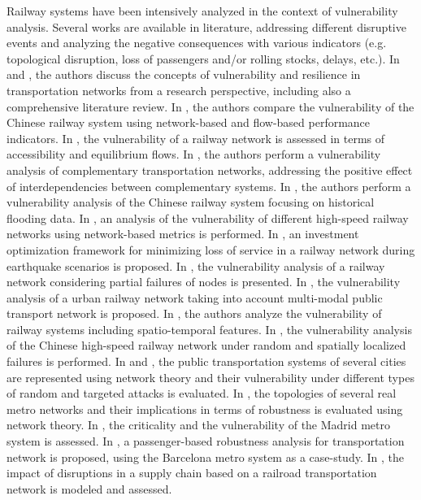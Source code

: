 \documentclass[review]{elsarticle}
\begin{document}
	Railway systems have been intensively analyzed in the context of vulnerability analysis. Several works are available in literature, addressing different disruptive events and analyzing the negative consequences with various indicators (e.g. topological disruption, loss of passengers and/or rolling stocks, delays, etc.). In \cite{mattsson2015vulnerability} and \cite{reggiani2015transport}, the authors discuss the concepts of vulnerability and resilience in transportation networks from a research perspective, including also a comprehensive literature review. In \cite{ouyang2014comparisons}, the authors compare the vulnerability of the Chinese railway system using network-based and flow-based performance indicators. In \cite{chen2007network}, the vulnerability of a railway network is assessed in terms of accessibility and equilibrium flows. In \cite{ouyang2015vulnerability}, the authors perform a vulnerability analysis of complementary transportation networks, addressing the positive effect of interdependencies between complementary systems. In \cite{hong2015vulnerability}, the authors perform a vulnerability analysis of the Chinese railway system focusing on historical flooding data. In \cite{zhang2016structural}, an analysis of the vulnerability of different high-speed railway networks using network-based metrics is performed. In \cite{yan2017pre}, an investment optimization framework for minimizing loss of service in a railway network during earthquake scenarios is proposed. In \cite{ye2019assessing}, the vulnerability analysis of a railway network considering partial failures of nodes is presented. In \cite{lu2019vulnerability}, the vulnerability analysis of a urban railway network taking into account multi-modal public transport network is proposed. In \cite{hong2019spatiotemporal}, the authors analyze the vulnerability of railway systems including  spatio-temporal features. In \cite{fang2020vulnerability}, the vulnerability analysis of the Chinese high-speed railway network under random and spatially localized failures is performed. In \cite{berche2009resilience} and \cite{berche2012transportation}, the public transportation systems of several cities are represented using network theory and their vulnerability under different types of random and targeted attacks is evaluated. In \cite{derrible2010complexity}, the topologies of several real metro networks and their implications in terms of robustness is evaluated using network theory. In \cite{rodriguez2014measuring}, the criticality and the vulnerability of the Madrid metro system is assessed. In \cite{de2012evaluating}, a passenger-based robustness analysis for transportation network is proposed, using the Barcelona metro system as a case-study. In \cite{gedik2014vulnerability}, the impact of disruptions in a supply chain based on a railroad transportation network is modeled and assessed.\\
\end{document}
